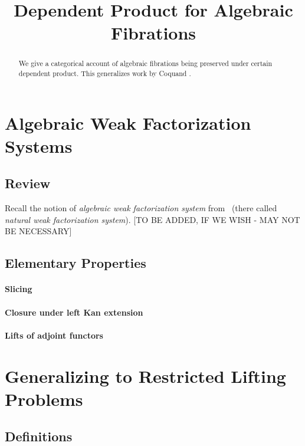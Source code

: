 \documentclass[reqno,10pt,a4paper,oneside]{amsart}
\title{Dependent Product for Algebraic Fibrations}
\begin{document}
\begin{abstract}
We give a categorical account of algebraic fibrations being preserved under certain dependent product.
This generalizes work by Coquand \etal.
\end{abstract}

\maketitle

\tableofcontents

\section{Algebraic Weak Factorization Systems}

\subsection{Review}

Recall the notion of \emph{algebraic weak factorization system} from~\cite{garner:small-object-argument} (there called \emph{natural weak factorization system}). [TO BE ADDED, IF WE WISH - MAY NOT BE NECESSARY] 

\subsection{Elementary Properties}

\paragraph{Slicing}

\paragraph{Closure under left Kan extension} 

\paragraph{Lifts of adjoint functors}

\section{Generalizing to Restricted Lifting Problems}

\subsection{Definitions}
\end{document}
